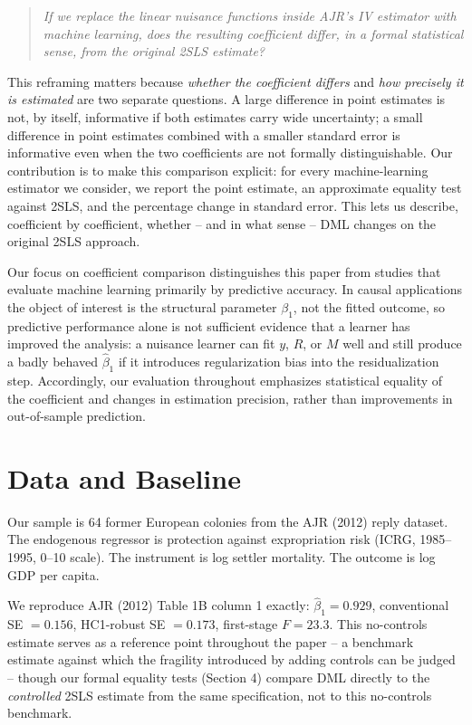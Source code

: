 \documentclass[10pt,twocolumn]{article}
\begin{document}
\begin{quote}
\small\itshape
If we replace the linear nuisance functions inside AJR's IV estimator
with machine learning, does the resulting coefficient differ, in a
formal statistical sense, from the original 2SLS estimate?
\end{quote}

This reframing matters because \emph{whether the coefficient differs}
and \emph{how precisely it is estimated} are two separate questions. A
large difference in point estimates is not, by itself, informative if
both estimates carry wide uncertainty; a small difference in point
estimates combined with a smaller standard error is informative even
when the two coefficients are not formally distinguishable. Our
contribution is to make this comparison explicit: for every
machine-learning estimator we consider, we report the point estimate, an
approximate equality test against 2SLS, and the percentage change in
standard error. This lets us describe, coefficient by coefficient,
whether -- and in what sense -- DML changes on the original 2SLS
approach.

Our focus on coefficient comparison distinguishes this paper from
studies that evaluate machine learning primarily by predictive
accuracy. In causal applications the object of interest is the
structural parameter $\beta_1$, not the fitted outcome, so predictive
performance alone is not sufficient evidence that a learner has
improved the analysis: a nuisance learner can fit $y$, $R$, or $M$
well and still produce a badly behaved $\hat\beta_1$ if it introduces
regularization bias into the residualization step. Accordingly, our
evaluation throughout emphasizes statistical equality of the
coefficient and changes in estimation precision, rather than
improvements in out-of-sample prediction.

\section{Data and Baseline}
Our sample is 64 former European colonies from the AJR (2012) reply
dataset. The endogenous regressor is protection against expropriation
risk (ICRG, 1985--1995, 0--10 scale). The instrument is log settler
mortality. The outcome is log GDP per capita.

We reproduce AJR (2012) Table 1B column 1 exactly: $\hat\beta_1 = 0.929$,
conventional SE $=0.156$, HC1-robust SE $=0.173$, first-stage $F=23.3$.
This no-controls estimate serves as a reference point throughout the
paper -- a benchmark estimate against which the fragility introduced by
adding controls can be judged -- though our formal equality tests
(Section 4) compare DML directly to the \emph{controlled} 2SLS estimate
from the same specification, not to this no-controls benchmark.
\end{document}
